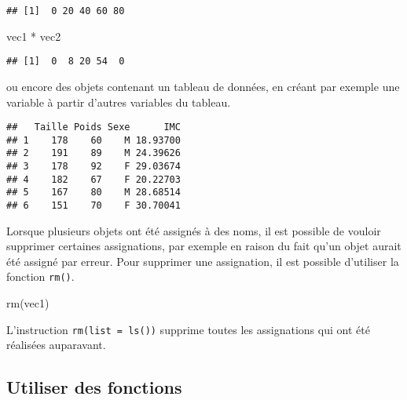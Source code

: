 \documentclass[
]{book}
\newenvironment{Shaded}{\begin{snugshade}}{\end{snugshade}}
\newcommand{\DecValTok}[1]{\textcolor[rgb]{0.00,0.00,0.81}{#1}}
\newcommand{\FunctionTok}[1]{\textcolor[rgb]{0.00,0.00,0.00}{#1}}
\newcommand{\NormalTok}[1]{#1}
\newcommand{\OtherTok}[1]{\textcolor[rgb]{0.56,0.35,0.01}{#1}}
\newcommand{\SpecialCharTok}[1]{\textcolor[rgb]{0.00,0.00,0.00}{#1}}
\begin{document}
\begin{verbatim}
## [1]  0 20 40 60 80
\end{verbatim}

\begin{Shaded}
\begin{Highlighting}[]
\NormalTok{vec1 }\SpecialCharTok{*}\NormalTok{ vec2}
\end{Highlighting}
\end{Shaded}

\begin{verbatim}
## [1]  0  8 20 54  0
\end{verbatim}

ou encore des objets contenant un tableau de données, en créant par exemple une variable à partir d'autres variables du tableau.

\begin{Shaded}
\end{Shaded}

\begin{verbatim}
##   Taille Poids Sexe      IMC
## 1    178    60    M 18.93700
## 2    191    89    M 24.39626
## 3    178    92    F 29.03674
## 4    182    67    F 20.22703
## 5    167    80    M 28.68514
## 6    151    70    F 30.70041
\end{verbatim}

Lorsque plusieurs objets ont été assignés à des noms, il est possible de vouloir supprimer certaines assignations, par exemple en raison du fait qu'un objet aurait été assigné par erreur. Pour supprimer une assignation, il est possible d'utiliser la fonction \texttt{rm()}.

\begin{Shaded}
\begin{Highlighting}[]
\FunctionTok{rm}\NormalTok{(vec1)}
\end{Highlighting}
\end{Shaded}

L'instruction \texttt{rm(list\ =\ ls())} supprime toutes les assignations qui ont été réalisées auparavant.

\hypertarget{utiliser-des-fonctions}{%
\subsection{Utiliser des fonctions}\label{utiliser-des-fonctions}}
\end{document}
